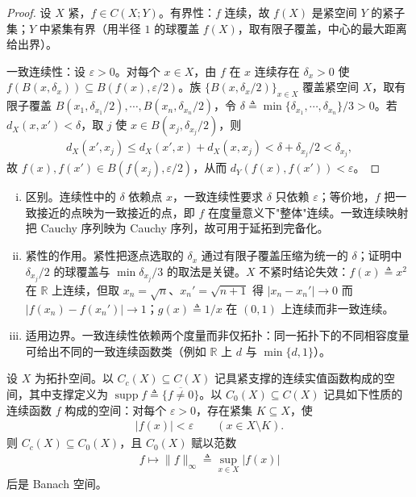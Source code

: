\documentclass[../main.tex]{subfiles}
\begin{document}
\begin{proof}
设 $X$ 紧，$f\in C(X;Y)$。有界性：$f$ 连续，故 $f(X)$ 是紧空间 $Y$ 的紧子集；$Y$ 中紧集有界（用半径 $1$ 的球覆盖 $f(X)$，取有限子覆盖，中心的最大距离给出界）。

一致连续性：设 $\varepsilon>0$。对每个 $x\in X$，由 $f$ 在 $x$ 连续存在 $\delta_x>0$ 使 $f(B(x,\delta_x))\subseteq B(f(x),\varepsilon/2)$。族 $\{B(x,\delta_x/2)\}_{x\in X}$ 覆盖紧空间 $X$，取有限子覆盖 $B(x_1,\delta_{x_1}/2),\cdots ,B(x_n,\delta_{x_n}/2)$，令 $\delta\triangleq\min\{\delta_{x_1},\cdots ,\delta_{x_n}\}/3>0$。若 $d_X(x,x')<\delta$，取 $j$ 使 $x\in B(x_j,\delta_{x_j}/2)$，则
\begin{align*}
d_X(x',x_j)\leqslant d_X(x',x)+d_X(x,x_j)<\delta+\delta_{x_j}/2<\delta_{x_j},
\end{align*}
故 $f(x),f(x')\in B(f(x_j),\varepsilon/2)$，从而 $d_Y(f(x),f(x'))<\varepsilon$。
\end{proof}

\begin{remark}\label{remark:appA-一致连续}
\begin{enumerate}[(i)]
\item 区别。连续性中的 $\delta$ 依赖点 $x$，一致连续性要求 $\delta$ 只依赖 $\varepsilon$；等价地，$f$ 把一致接近的点映为一致接近的点，即 $f$ 在度量意义下"整体"连续。一致连续映射把 Cauchy 序列映为 Cauchy 序列，故可用于延拓到完备化。
\item 紧性的作用。紧性把逐点选取的 $\delta_x$ 通过有限子覆盖压缩为统一的 $\delta$；证明中 $\delta_{x_j}/2$ 的球覆盖与 $\min\delta_{x_j}/3$ 的取法是关键。$X$ 不紧时结论失效：$f(x)\triangleq x^2$ 在 $\mathbb{R}$ 上连续，但取 $x_n=\sqrt{n}$、$x_n'=\sqrt{n+1}$ 得 $|x_n-x_n'|\to0$ 而 $|f(x_n)-f(x_n')|\to1$；$g(x)\triangleq1/x$ 在 $(0,1)$ 上连续而非一致连续。
\item 适用边界。一致连续性依赖两个度量而非仅拓扑：同一拓扑下的不同相容度量可给出不同的一致连续函数类（例如 $\mathbb{R}$ 上 $d$ 与 $\min\{d,1\}$）。
\end{enumerate}
\end{remark}

\begin{definition}[紧支连续函数与 $C_0$]\label{definition:appA-Cc与C0}
设 $X$ 为拓扑空间。以 $C_c(X)\subseteq C(X)$ 记具紧支撑的连续实值函数构成的空间，其中支撑定义为 $\operatorname{supp}f\triangleq\overline{\{f\neq0\}}$。以 $C_0(X)\subseteq C(X)$ 记具如下性质的连续函数 $f$ 构成的空间：对每个 $\varepsilon>0$，存在紧集 $K\subseteq X$，使
\begin{align*}
|f(x)|<\varepsilon\qquad(x\in X\setminus K).
\end{align*}
则 $C_c(X)\subseteq C_0(X)$，且 $C_0(X)$ 赋以范数
\begin{align*}
f\mapsto\|f\|_\infty\triangleq\sup_{x\in X}|f(x)|
\end{align*}
后是 Banach 空间。
\end{definition}
\end{document}
